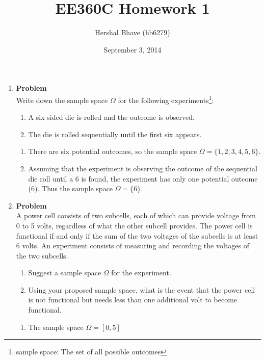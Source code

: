 \documentclass[12pt]{article}
\title{EE360C Homework 1}
\author{Hershal Bhave (hb6279)}
\date{September 3, 2014}
\newenvironment{Ex}{\vspace{1.5em}\textbf{Problem}\\}{}
\begin{document}
\maketitle
\begin{enumerate}
\item
  \begin{Ex}
    Write down the sample space $\Omega$ for the following
    experiments\footnote{sample space: The set of all possible
      outcomes}:
    \begin{enumerate}
    \item A six sided die is rolled and the outcome is observed.
    \item The die is rolled sequentially until the first six appears.
    \end{enumerate}
    \begin{solution} \hfill
      \begin{enumerate}
      \item There are six potential outcomes, so the sample space
        $\Omega = \{1,2,3,4,5,6\}$.
      \item Assuming that the experiment is observing the outcome of
        the sequential die roll until a 6 is found, the experiment has
        only one potential outcome (6). Thus the sample space $\Omega
        = \{6\}$.
      \end{enumerate}
    \end{solution}
  \end{Ex}
\item
  \begin{Ex}
    A power cell consists of two subcells, each of which can provide
    voltage from 0 to 5 volts, regardless of what the other subcell
    provides. The power cell is functional if and only if the sum of
    the two voltages of the subcells is at least 6 volts. An
    experiment consists of measuring and recording the voltages of the
    two subcells.
    \begin{enumerate}
    \item Suggest a sample space $\Omega$ for the experiment.
    \item Using your proposed sample space, what is the event that the
      power cell is not functional but needs less than one additional
      volt to become functional.
    \end{enumerate}
    \begin{solution} \hfill
      \begin{enumerate}
      \item The sample space $\Omega = [0,5]$

\end{enumerate}
\end{solution}
\end{Ex}
\end{enumerate}
\end{document}
